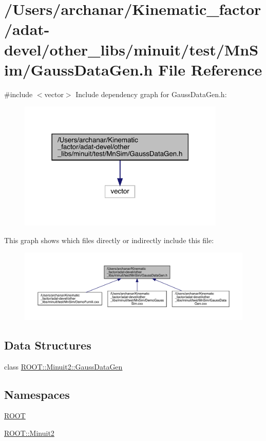 \hypertarget{adat-devel_2other__libs_2minuit_2test_2MnSim_2GaussDataGen_8h}{}\section{/\+Users/archanar/\+Kinematic\+\_\+factor/adat-\/devel/other\+\_\+libs/minuit/test/\+Mn\+Sim/\+Gauss\+Data\+Gen.h File Reference}
\label{adat-devel_2other__libs_2minuit_2test_2MnSim_2GaussDataGen_8h}
{\ttfamily \#include $<$vector$>$}\newline
Include dependency graph for Gauss\+Data\+Gen.\+h\+:
\nopagebreak
\begin{figure}[H]
\begin{center}
\leavevmode
\includegraphics[width=279pt]{db/d4d/adat-devel_2other__libs_2minuit_2test_2MnSim_2GaussDataGen_8h__incl}
\end{center}
\end{figure}
This graph shows which files directly or indirectly include this file\+:
\nopagebreak
\begin{figure}[H]
\begin{center}
\leavevmode
\includegraphics[width=350pt]{d3/dcd/adat-devel_2other__libs_2minuit_2test_2MnSim_2GaussDataGen_8h__dep__incl}
\end{center}
\end{figure}
\subsection*{Data Structures}
\begin{DoxyCompactItemize}
\item 
class \mbox{\hyperlink{classROOT_1_1Minuit2_1_1GaussDataGen}{R\+O\+O\+T\+::\+Minuit2\+::\+Gauss\+Data\+Gen}}
\end{DoxyCompactItemize}
\subsection*{Namespaces}
\begin{DoxyCompactItemize}
\item 
 \mbox{\hyperlink{namespaceROOT}{R\+O\+OT}}
\item 
 \mbox{\hyperlink{namespaceROOT_1_1Minuit2}{R\+O\+O\+T\+::\+Minuit2}}
\end{DoxyCompactItemize}
